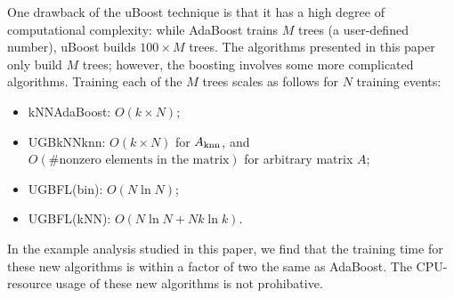 One drawback of the uBoost technique is that it has a high degree of computational complexity: 
while AdaBoost trains $M$ trees (a user-defined number), uBoost builds $100 \times M$ trees.  
The algorithms presented in this paper only build $M$ trees; however, the boosting involves some more complicated algorithms.  Training each of the $M$ trees scales as follows for $N$ training events:
\begin{itemize}
       \item kNNAdaBoost: $O(k \times N)$;
	\item UGBkNNknn: $O(k \times N)$ for $A_{\rm knn}$, and  
	$O( \text{\#nonzero elements in the matrix})$ for arbitrary matrix $A$;
	\item UGBFL(bin): $O(N \ln N)$;
	\item UGBFL(kNN): $O(N \ln N + N k \ln k) $.
\end{itemize}
In the example analysis studied in this paper, we find that the training time for these new algorithms is within a factor of two the same as AdaBoost.  The CPU-resource usage of these new algorithms is not prohibative. 
